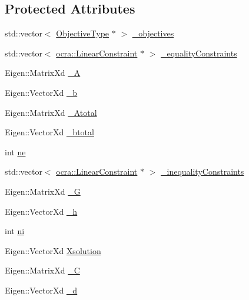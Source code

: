 \subsection*{Protected Attributes}
\begin{DoxyCompactItemize}
\item 
std\+::vector$<$ \hyperlink{classocra_1_1OneLevelSolver_a93b0be052a859bbd4c81584aa1646ffb}{Objective\+Type} $\ast$ $>$ \hyperlink{classocra_1_1OneLevelSolver_aa1b1b5c203c50e16fc9c8ff8256d8d6c}{\+\_\+objectives}
\item 
std\+::vector$<$ \hyperlink{namespaceocra_ae8b87cf4099be3efc3b410019ad2046e}{ocra\+::\+Linear\+Constraint} $\ast$ $>$ \hyperlink{classocra_1_1OneLevelSolver_a482b16a5c6e8a17c62b0a55a006f9c91}{\+\_\+equality\+Constraints}
\item 
Eigen\+::\+Matrix\+Xd \hyperlink{classocra_1_1OneLevelSolver_a95bb29fbd5260c74cc8d33078360b5fb}{\+\_\+A}
\item 
Eigen\+::\+Vector\+Xd \hyperlink{classocra_1_1OneLevelSolver_a3c1c1c408757dad2c9f4256ceb7340d2}{\+\_\+b}
\item 
Eigen\+::\+Matrix\+Xd \hyperlink{classocra_1_1OneLevelSolver_aa9b4b11abdc9c91af248b1f9e2a6d592}{\+\_\+\+Atotal}
\item 
Eigen\+::\+Vector\+Xd \hyperlink{classocra_1_1OneLevelSolver_a6ac65183fc93ea82d7e72fd4aae1422b}{\+\_\+btotal}
\item 
int \hyperlink{classocra_1_1OneLevelSolver_aeb834ab417c238bca2003c630703dbf8}{ne}
\item 
std\+::vector$<$ \hyperlink{namespaceocra_ae8b87cf4099be3efc3b410019ad2046e}{ocra\+::\+Linear\+Constraint} $\ast$ $>$ \hyperlink{classocra_1_1OneLevelSolver_a87161154a54c64ac44ec3a9cb2d9a6ec}{\+\_\+inequality\+Constraints}
\item 
Eigen\+::\+Matrix\+Xd \hyperlink{classocra_1_1OneLevelSolver_a01deacde23d6655fee88be9977636a5a}{\+\_\+G}
\item 
Eigen\+::\+Vector\+Xd \hyperlink{classocra_1_1OneLevelSolver_a8d4cbb48bc63b7b1b3f11603516ef120}{\+\_\+h}
\item 
int \hyperlink{classocra_1_1OneLevelSolver_a8746c04321945142300adc9883992fa7}{ni}
\item 
Eigen\+::\+Vector\+Xd \hyperlink{classocra_1_1OneLevelSolver_a6292cf12a5c6ae5a498a0962272a4b40}{Xsolution}
\item 
Eigen\+::\+Matrix\+Xd \hyperlink{classocra_1_1OneLevelSolver_aad5ebd6a765da03c843c6d63539e6450}{\+\_\+C}
\item 
Eigen\+::\+Vector\+Xd \hyperlink{classocra_1_1OneLevelSolver_a5fe79bb9685753a4db27e99f6b780832}{\+\_\+d}
\end{DoxyCompactItemize}
